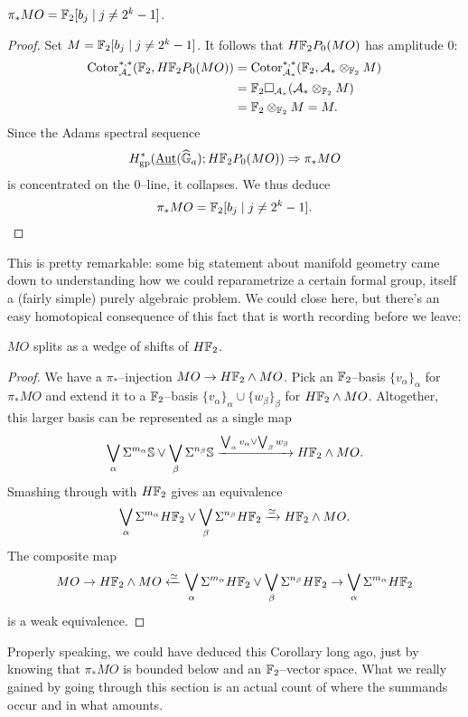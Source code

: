 \begin{corollary}
$\pi_* MO = \mathbb F_2[b_j \mid j \ne 2^k - 1]$.
\end{corollary}
\begin{proof}
Set $M = \mathbb F_2[b_j \mid j \ne 2^k - 1]$.    It follows that $H\mathbb F_2P_0(MO)$ has amplitude $0$:
\begin{align*}
\operatorname{Cotor}_{\mathcal A_*}^{*, *}(\mathbb F_2, H\mathbb F_2P_0(MO)) & = \operatorname{Cotor}_{\mathcal A_*}^{*, *}(\mathbb F_2, \mathcal A_* \otimes_{\mathbb F_2} M) \\
& = \mathbb F_2 \square_{\mathcal A_*} (\mathcal A_* \otimes_{\mathbb F_2} M) \\
& = \mathbb F_2 \otimes_{\mathbb F_2} M = M.
\end{align*}
Since the Adams spectral sequence \[H^*_{\mathrm{gp}}(\operatorname{\underline{\smash{\operatorname{Aut}}}}(\widehat{\mathbb G}_a); H\mathbb F_2P_0(MO)) \Rightarrow \pi_* MO\] is concentrated on the $0$--line, it collapses.  We thus deduce \[\pi_* MO = \mathbb F_2[b_j \mid j \ne 2^k-1]. \qedhere\]
\end{proof}

This is pretty remarkable: some big statement about manifold geometry came down to understanding how we could reparametrize a certain formal group, itself a (fairly simple) purely algebraic problem.  We could close here, but there's an easy homotopical consequence of this fact that is worth recording before we leave:

\begin{lemma}
$MO$ splits as a wedge of shifts of $H\mathbb F_2$.
\end{lemma}
\begin{proof}
We have a $\pi_*$--injection $MO \to H\mathbb F_2 \wedge MO$.  Pick an $\mathbb F_2$--basis $\{v_\alpha\}_\alpha$ for $\pi_* MO$ and extend it to a $\mathbb F_2$--basis $\{v_\alpha\}_\alpha \cup \{w_\beta\}_\beta$ for $H\mathbb F_2 \wedge MO$.  Altogether, this larger basis can be represented as a single map \[\bigvee_\alpha \Sigma^{m_\alpha} \mathbb S \vee \bigvee_\beta \Sigma^{n_\beta} \mathbb S \xrightarrow{\bigvee_\alpha v_\alpha \vee \bigvee_\beta w_\beta} H\mathbb F_2 \wedge MO.\]  Smashing through with $H\mathbb F_2$ gives an equivalence \[\bigvee_\alpha \Sigma^{m_\alpha} H\mathbb F_2 \vee \bigvee_\beta \Sigma^{n_\beta} H\mathbb F_2 \xrightarrow\simeq H\mathbb F_2 \wedge MO.\]  The composite map \[MO \to H\mathbb F_2 \wedge MO \xleftarrow\simeq \bigvee_\alpha \Sigma^{m_\alpha} H\mathbb F_2 \vee \bigvee_\beta \Sigma^{n_\beta} H\mathbb F_2 \to \bigvee_\alpha \Sigma^{m_\alpha} H\mathbb F_2\] is a weak equivalence.
\end{proof}

\begin{remark}
Properly speaking, we could have deduced this Corollary long ago, just by knowing that $\pi_* MO$ is bounded below and an $\mathbb F_2$--vector space.  What we really gained by going through this section is an actual count of where the summands occur and in what amounts.
\end{remark}



